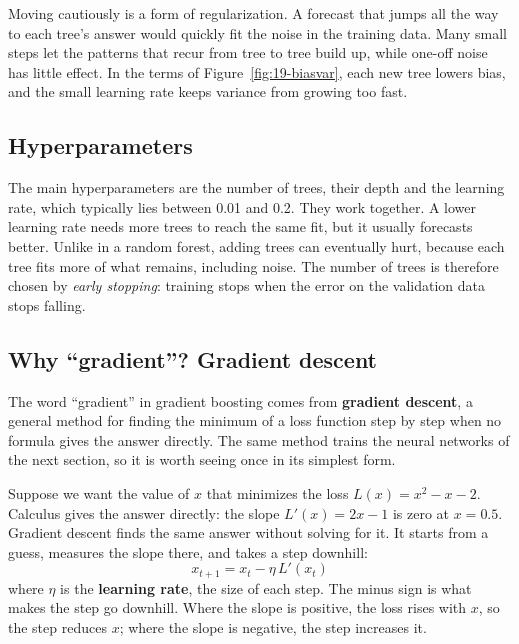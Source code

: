 Moving cautiously is a form of regularization. A forecast that jumps all the way to each tree's answer would quickly fit the noise in the training data. Many small steps let the patterns that recur from tree to tree build up, while one-off noise has little effect. In the terms of Figure~\ref{fig:19-biasvar}, each new tree lowers bias, and the small learning rate keeps variance from growing too fast.

\subsection{Hyperparameters}

The main hyperparameters are the number of trees, their depth and the learning rate, which typically lies between 0.01 and 0.2. They work together. A lower learning rate needs more trees to reach the same fit, but it usually forecasts better. Unlike in a random forest, adding trees can eventually hurt, because each tree fits more of what remains, including noise. The number of trees is therefore chosen by \emph{early stopping}: training stops when the error on the validation data stops falling.

\subsection{Why ``gradient''? Gradient descent}

The word ``gradient'' in gradient boosting comes from \textbf{gradient descent}, a general method for finding the minimum of a loss function step by step when no formula gives the answer directly. The same method trains the neural networks of the next section, so it is worth seeing once in its simplest form.

Suppose we want the value of $x$ that minimizes the loss $L(x) = x^2 - x - 2$. Calculus gives the answer directly: the slope $L'(x) = 2x - 1$ is zero at $x = 0.5$. Gradient descent finds the same answer without solving for it. It starts from a guess, measures the slope there, and takes a step downhill:
\begin{equation}
  x_{t+1} = x_t - \eta \, L'(x_t)
  \label{eq:19-gd}
\end{equation}
where $\eta$ is the \textbf{learning rate}, the size of each step. The minus sign is what makes the step go downhill. Where the slope is positive, the loss rises with $x$, so the step reduces $x$; where the slope is negative, the step increases it.

